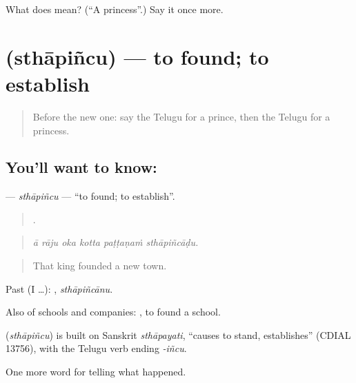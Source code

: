 \begin{tcolorbox}[breakable,colback=teal!4,colframe=teal!35!black,title={Before you move on}]
What does  mean? (\textquotedblleft{}A princess\textquotedblright{}.) Say it once more.
\end{tcolorbox}
\section[\texorpdfstring{\te{స్థాపించు} (sthāpiñcu)}{స్థాపించు (sthāpiñcu)}]{ (sthāpiñcu) — to found; to establish}

\label{lesson:TE-C359-sthapincu}



\begin{quote}
Before the new one: say the Telugu for a prince, then the Telugu for a princess.
\end{quote}

\subsection*{You'll want to know: }
\textbf{} — \emph{sthāpiñcu} — \textquotedblleft{}to found; to establish\textquotedblright{}.

\begin{quote}
     .
\end{quote}

\begin{quote}
\emph{ā rāju oka kotta paṭṭaṇaṁ sthāpiñcāḍu.}
\end{quote}

\begin{quote}
That king founded a new town.
\end{quote}

Past (I …): , \emph{sthāpiñcānu}.

Also of schools and companies:  , to found a school.

\begin{cousinweb}
\textbf{} (\emph{sthāpiñcu}) is built on Sanskrit \emph{sthāpayati}, \textquotedblleft{}causes to stand, establishes\textquotedblright{} (CDIAL 13756), with the Telugu verb ending \emph{-iñcu}.
\end{cousinweb}

\begin{grammarlens}[title={What you've built}]
One more word for telling what happened.
\end{grammarlens}


